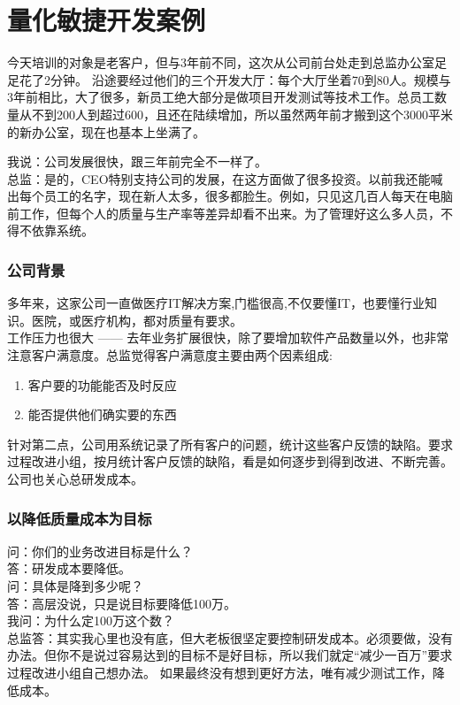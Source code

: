 \chapter{量化敏捷开发案例} %

今天培训的对象是老客户，但与3年前不同，这次从公司前台处走到总监办公室足足花了2分钟。
沿途要经过他们的三个开发大厅：每个大厅坐着70到80人。规模与3年前相比，大了很多，新员工绝大部分是做项目开发测试等技术工作。总员工数量从不到200人到超过600，且还在陆续增加，所以虽然两年前才搬到这个3000平米的新办公室，现在也基本上坐满了。

我说：公司发展很快，跟三年前完全不一样了。\\
总监：是的，CEO特别支持公司的发展，在这方面做了很多投资。以前我还能喊出每个员工的名字，现在新人太多，很多都脸生。例如，只见这几百人每天在电脑前工作，但每个人的质量与生产率等差异却看不出来。为了管理好这么多人员，不得不依靠系统。

\hypertarget{ux516cux53f8ux80ccux666f}{%
\subsection{公司背景}\label{ux516cux53f8ux80ccux666f}}

多年来，这家公司一直做医疗IT解决方案,门槛很高,不仅要懂IT，也要懂行业知识。医院，或医疗机构，都对质量有要求。\\
工作压力也很大 ------
去年业务扩展很快，除了要增加软件产品数量以外，也非常注意客户满意度。总监觉得客户满意度主要由两个因素组成:

\begin{enumerate}
\tightlist
\item
  客户要的功能能否及时反应
\item
  能否提供他们确实要的东西
\end{enumerate}

针对第二点，公司用系统记录了所有客户的问题，统计这些客户反馈的缺陷。要求过程改进小组，按月统计客户反馈的缺陷，看是如何逐步到得到改进、不断完善。公司也关心总研发成本。

\hypertarget{ux4ee5ux964dux4f4eux8d28ux91cfux6210ux672cux4e3aux76eeux6807}{%
\subsection{以降低质量成本为目标}\label{ux4ee5ux964dux4f4eux8d28ux91cfux6210ux672cux4e3aux76eeux6807}}

问：你们的业务改进目标是什么？\\
答：研发成本要降低。\\
问：具体是降到多少呢？\\
答：高层没说，只是说目标要降低100万。\\
我问：为什么定100万这个数？\\
总监答：其实我心里也没有底，但大老板很坚定要控制研发成本。必须要做，没有办法。但你不是说过容易达到的目标不是好目标，所以我们就定``减少一百万''要求过程改进小组自己想办法。
如果最终没有想到更好方法，唯有减少测试工作，降低成本。

